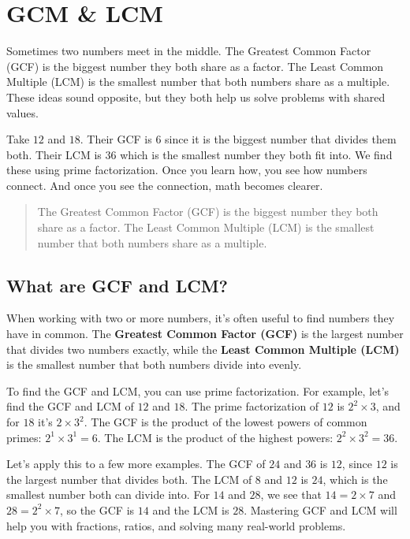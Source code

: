 \cleardoublepage

\section{GCM \& LCM}

Sometimes two numbers meet in the middle. The Greatest Common Factor (GCF) is the
biggest number they both share as a factor. The Least Common Multiple (LCM) is the
smallest number that both numbers share as a multiple. These ideas sound opposite,
but they both help us solve problems with shared values.

Take \(12\) and \(18\). Their GCF is \(6\) since it is the biggest number that
divides them both. Their LCM is \(36\) which is the smallest number they both fit
into. We find these using prime factorization. Once you learn how, you see how
numbers connect. And once you see the connection, math becomes clearer.

\blockquote{The Greatest Common Factor (GCF) 
is the biggest number they both share
as a factor. The Least Common Multiple (LCM) 
is the smallest number that both
numbers share as a multiple.}

\subsection{What are GCF and LCM?}

When working with two or more numbers, it's often useful to find numbers they have
in common. The \textbf{Greatest Common Factor (GCF)} is the largest number that
divides two numbers exactly, while the \textbf{Least Common Multiple (LCM)} is the
smallest number that both numbers divide into evenly.

To find the GCF and LCM, you can use prime factorization. For example, let's find
the GCF and LCM of \(12\) and \(18\). The prime factorization of \(12\) is \(2^2
\times 3\), and for \(18\) it's \(2 \times 3^2\). The GCF is the product of the
lowest powers of common primes: \(2^1 \times 3^1 = 6\). The LCM is the product of
the highest powers: \(2^2 \times 3^2 = 36\).

Let's apply this to a few more examples. The GCF of \(24\) and \(36\) is \(12\),
since \(12\) is the largest number that divides both. The LCM of \(8\) and \(12\)
is \(24\), which is the smallest number both can divide into. For \(14\) and
\(28\), we see that \(14 = 2 \times 7\) and \(28 = 2^2 \times 7\), so the GCF is
\(14\) and the LCM is \(28\). Mastering GCF and LCM will help you with fractions,
ratios, and solving many real-world problems.



% 
% 
% 